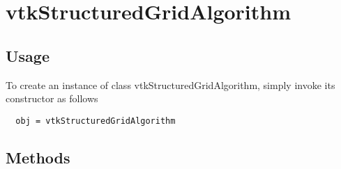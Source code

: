 \section{vtkStructuredGridAlgorithm}

\subsection{Usage}


To create an instance of class vtkStructuredGridAlgorithm, simply
invoke its constructor as follows
\begin{verbatim}
  obj = vtkStructuredGridAlgorithm
\end{verbatim}
\subsection{Methods}

